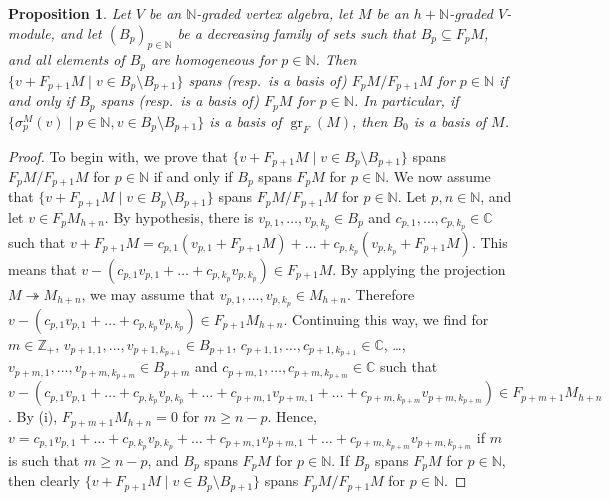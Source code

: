 \documentclass[a4paper, 12pt, reqno]{amsart}
\newtheorem{proposition}[theorem]{Proposition}
\theoremstyle{remark}
\DeclareMathOperator{\gr}{gr}
\begin{document}
\begin{proposition}
  \label{prp:17}
  Let $V$ be an $\mathbb{N}$-graded vertex algebra, let $M$ be an $h + \mathbb{N}$-graded $V$-module, and let $(B_p)_{p \in \mathbb{N}}$ be a decreasing family of sets such that $B_p \subseteq F_pM$, and all elements of $B_p$ are homogeneous for $p \in \mathbb{N}$.
  Then $\{v + F_{p + 1}M \mid v \in B_p \setminus B_{p + 1}\}$ spans (resp.\ is a basis of) $F_pM/F_{p + 1}M$ for $p \in \mathbb{N}$ if and only if $B_p$ spans (resp.\ is a basis of) $F_pM$ for $p \in \mathbb{N}$.
  In particular, if $\{\sigma_p^M(v) \mid p \in \mathbb{N}, v \in B_p \setminus B_{p + 1}\}$ is a basis of $\gr_F(M)$, then $B_0$ is a basis of $M$.
\end{proposition}

\begin{proof}
  To begin with, we prove that $\{v + F_{p + 1}M \mid v \in B_p \setminus B_{p + 1}\}$ spans $F_pM/F_{p + 1}M$ for $p \in \mathbb{N}$ if and only if $B_p$ spans $F_pM$ for $p \in \mathbb{N}$.
  We now assume that $\{v + F_{p + 1}M \mid v \in B_p \setminus B_{p + 1}\}$ spans $F_pM/F_{p + 1}M$ for $p \in \mathbb{N}$.
  Let $p, n \in \mathbb{N}$, and let $v \in F_pM_{h + n}$.
  By hypothesis, there is $v_{p, 1}, \dots, v_{p, k_p} \in B_p$ and $c_{p, 1}, \dots, c_{p, k_p} \in \mathbb{C}$ such that $v + F_{p + 1}M = c_{p, 1}(v_{p, 1} + F_{p + 1}M) + \dots + c_{p, k_p}(v_{p, k_p} + F_{p + 1}M)$.
  This means that $v - (c_{p, 1}v_{p, 1} + \dots +  c_{p, k_p}v_{p, k_p}) \in F_{p +1}M$.
  By applying the projection $M \twoheadrightarrow M_{h + n}$, we may assume that $v_{p, 1}, \dots ,v_{p, k_p} \in M_{h + n}$.
  Therefore $v - (c_{p, 1}v_{p, 1} + \dots +  c_{p, k_p}v_{p, k_p}) \in F_{p +1}M_{h + n}$.
  Continuing this way, we find for $m \in \mathbb{Z}_+$, $v_{p + 1, 1}, \dots, v_{p + 1, k_{p + 1}} \in B_{p + 1}$, $c_{p + 1, 1}, \dots, c_{p + 1, k_{p + 1}} \in \mathbb{C}$, \dots, $v_{p + m, 1}, \dots, v_{p + m, k_{p + m}} \in B_{p + m}$ and $c_{p + m, 1}, \dots, c_{p + m, k_{p + m}} \in \mathbb{C}$ such that $v - (c_{p, 1}v_{p, 1} + \dots + c_{p, k_p}v_{p, k_p} + \dots + c_{p + m, 1}v_{p + m, 1} + \dots + c_{p + m, k_{p + m}}v_{p + m, k_{p + m}}) \in F_{p + m + 1}M_{h + n}$.
  By (i), $F_{p + m + 1}M_{h + n} = 0$ for $m \ge n - p$.
  Hence, $v = c_{p, 1}v_{p, 1} + \dots + c_{p, k_p}v_{p, k_p} + \dots + c_{p + m, 1}v_{p + m, 1} + \dots + c_{p + m, k_{p + m}}v_{p + m, k_{p + m}}$ if $m$ is such that $m \ge n - p$, and $B_p$ spans $F_pM$ for $p \in \mathbb{N}$.
  If $B_p$ spans $F_pM$ for $p \in \mathbb{N}$, then clearly $\{v + F_{p + 1}M \mid v \in B_p \setminus B_{p + 1}\}$ spans $F_pM/F_{p + 1}M$ for $p \in \mathbb{N}$.


\end{proof}
\end{document}
